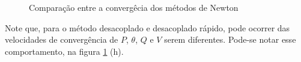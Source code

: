 \begin{figure}[!htb]
    \qquad
    \qquad
    \qquad

    \caption{Comparação entre a convergêcia dos métodos de Newton}%
    \label{Fig:IEEE14NewtonComparison2}%
\end{figure}

Note que, para o método desacoplado e desacoplado rápido, pode ocorrer das velocidades de convergência de $P$, $\theta$, $Q$ e $V$ serem diferentes. Pode-se notar esse comportamento, na figura \ref{Fig:IEEE14NewtonComparison2} (h). \\